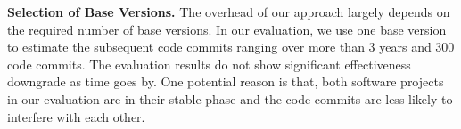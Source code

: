 \textbf{Selection of Base Versions.}
The overhead of our approach largely depends on the required number of base versions. In our evaluation, we use one base version to estimate the subsequent code commits ranging over more than 3 years and 300 code commits. The evaluation results do not show significant effectiveness downgrade as time goes by. One potential reason is that, both software projects in our evaluation are in their stable phase and the code commits are less likely to interfere with each other. 

%







